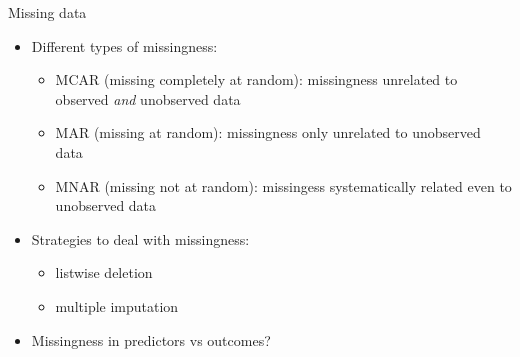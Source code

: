 \documentclass[
  ignorenonframetext,
]{beamer}
\providecommand{\tightlist}{%
  \setlength{\itemsep}{0pt}\setlength{\parskip}{0pt}}
\newcommand{\setsep}{\setlength{\itemsep}{3pt}}
\newcommand{\setskip}{\setlength{\parskip}{3pt}}
\renewcommand{\tightlist}{\setsep\setskip}
\begin{document}
\begin{frame}{Missing data}
\protect\hypertarget{missing-data}{}
\pause

\begin{itemize}[<+->]
\tightlist
\item
  Different types of missingness:

  \begin{itemize}[<+->]
  \tightlist
  \item
    \textcolor<7-8>{BurntOrange}{MCAR (missing completely at random): missingness unrelated to observed \textit{and} unobserved data}
  \item
    \textcolor<8>{BurntOrange}{MAR (missing at random): missingness only unrelated to unobserved data}
  \item
    MNAR (missing not at random): missingess systematically related even to unobserved data
  \end{itemize}
\item
  Strategies to deal with missingness:

  \begin{itemize}[<+->]
  \tightlist
  \item
    listwise deletion
  \item
    multiple imputation
  \end{itemize}
\item
  Missingness in predictors vs outcomes?
\end{itemize}
\end{frame}
\end{document}
